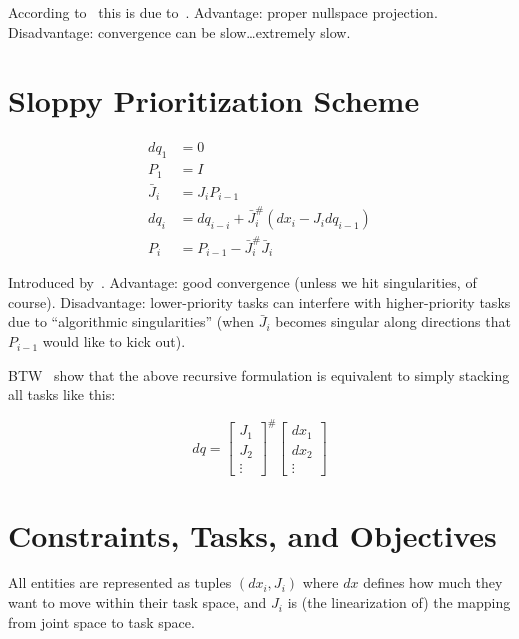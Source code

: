 \documentclass{article}
\begin{document}
According to~\cite{mistry:2007} this is due to~\cite{chiaverini:1997}.
Advantage: proper nullspace projection.
Disadvantage: convergence can be slow\ldots extremely slow.



\section{Sloppy Prioritization Scheme}

\begin{align}
  dq_1 &= 0 \\
  P_1 &= I \\
  \bar{J}_i &= J_iP_{i-1} \\
  dq_i &= dq_{i-i} + \bar{J}_i^\#(dx_i-J_idq_{i-1}) \\
  P_i &= P_{i-1} - \bar{J}_i^\#\bar{J}_i
\end{align}

Introduced by~\cite{siciliano:1991}.
Advantage: good convergence (unless we hit singularities, of course).
Disadvantage: lower-priority tasks can interfere with higher-priority tasks due to ``algorithmic singularities'' (when $\bar{J}_i$ becomes singular along directions that $P_{i-1}$ would like to kick out).

BTW~\cite{mistry:2007} show that the above recursive formulation is equivalent to simply stacking all tasks like this:

\begin{equation}
  dq =
  \begin{bmatrix}
    J_1 \\
    J_2 \\
    \vdots
  \end{bmatrix}
  ^\#
  \begin{bmatrix}
    dx_1 \\
    dx_2 \\
    \vdots
  \end{bmatrix}
\end{equation}



\section{Constraints, Tasks, and Objectives}

All entities are represented as tuples $(dx_i, J_i)$ where $dx$ defines how much they want to move within their task space, and $J_i$ is (the linearization of) the mapping from joint space to task space.
\end{document}
